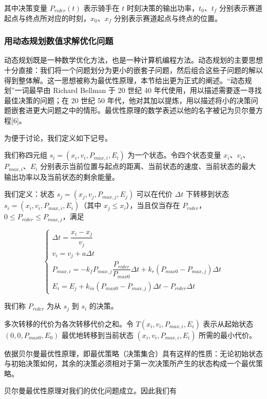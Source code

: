\documentclass[11pt,a4paper]{ctexart}
\begin{document}
其中决策变量 $P_{rider}(t)$ 表示骑手在 $t$ 时刻决策的输出功率，$t_0$、$t_f$ 分别表示赛道起点与终点所对应的时刻，$x_0$、$x_f$ 分别表示赛道起点与终点的位置。

\subsubsection{用动态规划数值求解优化问题}

动态规划既是一种数学优化方法，也是一种计算机编程方法。动态规划的主要思想十分直接：我们将一个问题划分为更小的嵌套子问题，然后组合这些子问题的解以得到整体解。这一思想被称为最优性原理，本节给出更为正式的阐述。“动态规划”一词最早由 Richard Bellman 于 20 世纪 40 年代使用，用以描述需要逐一寻找最佳决策的问题；在 20 世纪 50 年代，他对其加以提炼，用以描述将小的决策问题嵌套进更大问题之中的情形。最优性原理的数学表述以他的名字被记为贝尔曼方程[6]。

为便于讨论，我们定义如下记号。

我们称四元组 $s_i=(x_i,v_i,P_{max,i},E_i)$ 为一个状态。令四个状态变量 $x_i$、$v_i$、$P_{max,i}$、$E_i$ 分别表示当前位置与起点的距离、当前状态的速度、当前状态的最大输出功率以及当前状态的剩余能量。

我们定义：状态 $s_j=(x_j,v_j,P_{max,j},E_j)$ 可以在代价 $\Delta t$ 下转移到状态 $s_i=(x_i,v_i,P_{max,i},E_i)$（其中 $x_j\leqslant x_i$），当且仅当存在 $P_{rider}$，$0\leqslant P_{rider}\leqslant P_{max,j}$，满足

\begin{equation}
\begin{cases}
\Delta t=\dfrac{x_i-x_j}{v_j}\\[0.6em]
v_i=v_j+a\Delta t\\[0.4em]
P_{max,i}=-k_f P_{max,j}\dfrac{P_{rider}}{P_{max0}}\Delta t+k_r\left(P_{max0}-P_{max,j}\right)\Delta t\\[0.6em]
E_i=E_j+k_{in}\left(P_{max0}-P_{max,j}\right)\Delta t-P_{rider}\Delta t
\end{cases}
\end{equation}

我们称 $P_{rider}$ 为从 $s_j$ 到 $s_i$ 的决策。

多次转移的代价为各次转移代价之和。令 $T(x_i,v_i,P_{max,i},E_i)$ 表示从起始状态 $(0,0,P_{max0},E_0)$ 最优地转移到当前状态 $(x_i,v_i,P_{max,i},E_i)$ 所需的最小代价。

依据贝尔曼最优性原理，即最优策略（决策集合）具有这样的性质：无论初始状态与初始决策如何，其余的决策必须相对于第一次决策所产生的状态构成一个最优策略。

贝尔曼最优性原理对我们的优化问题成立。因此我们有
\end{document}
